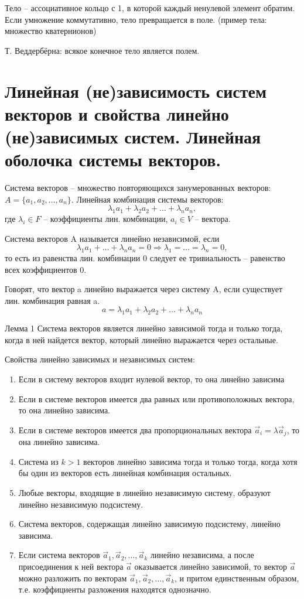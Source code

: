 \documentclass{article}
\begin{document}
\textsf{Тело} – ассоциативное кольцо с 1, в которой каждый ненулевой элемент обратим.
Если умножение коммутативно, тело превращается в поле. (пример тела: множество кватернионов)

\textsf{Т. Веддербёрна:} всякое конечное тело является полем.

\section{Линейная (не)зависимость систем векторов и свойства линейно (не)зависимых систем. Линейная оболочка системы векторов.}

Система векторов – множество повторяющихся занумерованных векторов: $A = \{a_1,a_2,\dots,a_n\}$. Линейная комбинация системы векторов:
$$\lambda_1a_1+\lambda_2a_2+\dots+\lambda_na_n,$$
где $\lambda_i\in F$ – коэффициенты лин. комбинации, $a_i\in V$ – вектора.

Система векторов A называется \textsf{линейно независимой}, если
$$\lambda_1a_1+\dots+\lambda_na_n=0\Rightarrow \lambda_1=\dots=\lambda_n=0,$$
то есть из равенства лин. комбинации 0 следует ее тривиальность – равенство всех коэффициентов 0.

Говорят, что вектор a \textsf{линейно выражается} через систему A, если существует лин. комбинация равная a.
$$a=\lambda_1a_1+\lambda_2a_2+\dots+\lambda_na_n$$

\textsf{Лемма 1}
Система векторов является \textsf{линейно зависимой} тогда и только тогда, когда в ней найдется вектор, который линейно выражается через остальные.

Свойства линейно зависимых и независимых систем:
\begin{enumerate}
    \item Если в систему векторов входит нулевой вектор, то она линейно зависима
    \item Если в системе векторов имеется два равных или противоположных вектора, то она линейно зависима.
    \item Если в системе векторов имеется два пропорциональных вектора $\vec{a}_i=\lambda\vec{a}_j$, то она линейно зависима.
    \item Система из $k>1$ векторов линейно зависима тогда и только тогда, когда хотя бы один из векторов есть линейная комбинация остальных.
    \item Любые векторы, входящие в линейно независимую систему, образуют линейно независимую подсистему.
    \item Система векторов, содержащая линейно зависимую подсистему, линейно зависима.
    \item Если система векторов $\vec{a}_1,\vec{a}_2, \ldots, \vec{a}_k$ линейно независима, а после присоединения к ней вектора $\vec{a}$ оказывается линейно зависимой, то вектор $\vec{a}$ можно разложить по векторам $\vec{a}_1,\vec{a}_2,\ldots,\vec{a}_k$, и притом единственным образом, т.е. коэффициенты разложения находятся однозначно.
\end{enumerate}
\end{document}
